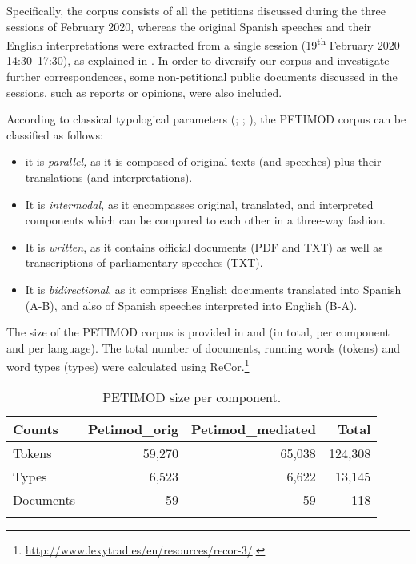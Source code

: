 \documentclass[output=paper]{langscibook}
\begin{document}
Specifically, the corpus consists of all the petitions discussed during the three sessions of February 2020, whereas the original Spanish speeches and their English interpretations were extracted from a single session (19\textsuperscript{th} February 2020 14:30--17:30), as explained in . In order to diversify our corpus and investigate further correspondences, some non-petitional public documents discussed in the sessions, such as reports or opinions, were also included.

According to classical typological parameters (\citealt{CorpasPastor2001}; \citealt{Olohan2004}; \citealt{Shlesinger2008}), the PETIMOD corpus can be classified as follows:

\begin{itemize}
\item 
it is \textit{parallel,} as it is composed of original texts (and speeches) plus their translations (and interpretations).

\item 
It is \textit{intermodal,} as it encompasses original, translated, and interpreted components which can be compared to each other in a three-way fashion.

\item 
It is \textit{written}, as it contains official documents (PDF and TXT) as well as transcriptions of parliamentary speeches (TXT).

\item 
It is \textit{bidirectional}, as it comprises English documents translated into Spanish (A-B), and also of Spanish speeches interpreted into English (B-A).

\end{itemize}

The size of the PETIMOD corpus is provided in  and  (in total, per component and per language). The total number of documents, running words (tokens) and word types (types) were calculated using ReCor.\footnote{\url{http://www.lexytrad.es/en/resources/recor-3/}.}


\begin{table}
\begin{tabularx}{\textwidth}{Qrrr}

\lsptoprule

{\bfseries Counts} & {\bfseries Petimod\_orig} & {\bfseries Petimod\_mediated} & {\bfseries Total} \\
\midrule
Tokens & 59,270 & 65,038 & 124,308\\
Types & 6,523 & 6,622 & 13,145\\
Documents & 59 & 59 & 118\\
\lspbottomrule
\end{tabularx}
\caption{
PETIMOD size per component.
}
\label{tab:corpas:2}
\end{table}
\end{document}
